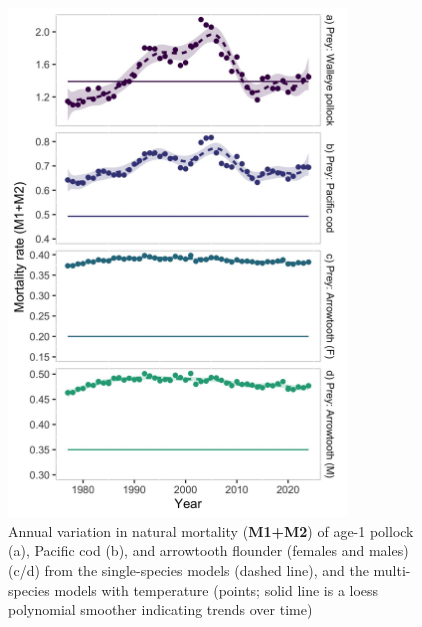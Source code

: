 \documentclass[
]{article}
\begin{document}
\begin{figure}
\centering
\includegraphics[width=0.8\textwidth,height=\textheight]{Results/ESR_Fig1.jpg}
\caption{Annual variation in natural mortality (\textbf{M1+M2}) of age-1
pollock (a), Pacific cod (b), and arrowtooth flounder (females and
males) (c/d) from the single-species models (dashed line), and the
multi-species models with temperature (points; solid line is a loess
polynomial smoother indicating trends over time)}
\end{figure}
\end{document}
